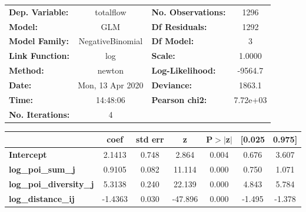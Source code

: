 \begin{center}
\begin{tabular}{lclc}
\toprule
\textbf{Dep. Variable:}         &    totalflow     & \textbf{  No. Observations:  } &     1296    \\
\textbf{Model:}                 &       GLM        & \textbf{  Df Residuals:      } &     1292    \\
\textbf{Model Family:}          & NegativeBinomial & \textbf{  Df Model:          } &        3    \\
\textbf{Link Function:}         &       log        & \textbf{  Scale:             } &    1.0000   \\
\textbf{Method:}                &      newton      & \textbf{  Log-Likelihood:    } &   -9564.7   \\
\textbf{Date:}                  & Mon, 13 Apr 2020 & \textbf{  Deviance:          } &    1863.1   \\
\textbf{Time:}                  &     14:48:06     & \textbf{  Pearson chi2:      } &  7.72e+03   \\
\textbf{No. Iterations:}        &        4         & \textbf{                     } &             \\
\bottomrule
\end{tabular}
\begin{tabular}{lcccccc}
                                & \textbf{coef} & \textbf{std err} & \textbf{z} & \textbf{P$> |$z$|$} & \textbf{[0.025} & \textbf{0.975]}  \\
\midrule
\textbf{Intercept}              &       2.1413  &        0.748     &     2.864  &         0.004        &        0.676    &        3.607     \\
\textbf{log\_poi\_sum\_j}       &       0.9105  &        0.082     &    11.114  &         0.000        &        0.750    &        1.071     \\
\textbf{log\_poi\_diversity\_j} &       5.3138  &        0.240     &    22.139  &         0.000        &        4.843    &        5.784     \\
\textbf{log\_distance\_ij}      &      -1.4363  &        0.030     &   -47.896  &         0.000        &       -1.495    &       -1.378     \\
\bottomrule
\end{tabular}
\end{center}
